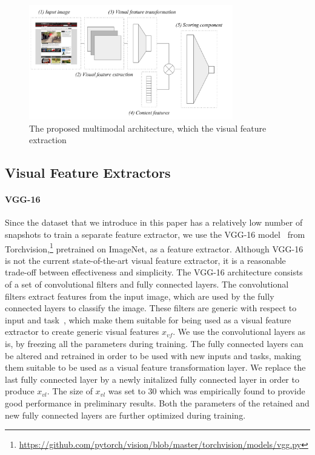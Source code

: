 

\begin{figure}[t]
\includegraphics[width = 3.5in]{images/multimodelarchitecture.pdf}
\caption{The proposed multimodal architecture, which the visual feature extraction}
\label{fig:multimodelarchitecture}
\end{figure}


\subsection{Visual Feature Extractors}
\paragraph{VGG-16}
Since the \datasetname{} data\-set that we introduce in this paper has a relatively low number of snapshots to train a separate feature extractor, we use the VGG-16 model~\cite{simonyan2014very} from Torchvision,\footnote{\url{https://github.com/pytorch/vision/blob/master/torchvision/models/vgg.py}} pretrained on ImageNet, as a feature extractor. 
Although VGG-16 is not the current state-of-the-art visual feature extractor, it is a reasonable trade-off between effectiveness and simplicity.
The VGG-16 architecture consists of a set of convolutional filters and fully connected layers. 
The convolutional filters extract features from the input image, which are used by the fully connected layers to classify the image. 
These filters are generic with respect to input and task~\citep{donahue2014decaf}, which make them suitable for being used as a visual feature extractor to create generic visual features $x_{vf}$. We use the convolutional layers as is, by freezing all the parameters during training. The fully connected layers can be altered and retrained in order to be used with new inputs and tasks, making them suitable to be used as a visual feature transformation layer. We replace the last fully connected layer by a newly initalized fully connected layer in order to produce $x_{vl}$. The size of $x_{vl}$ was set to $30$ which was empirically found to provide good performance in preliminary results. Both the parameters of the retained and new fully connected layers are further optimized during training.




